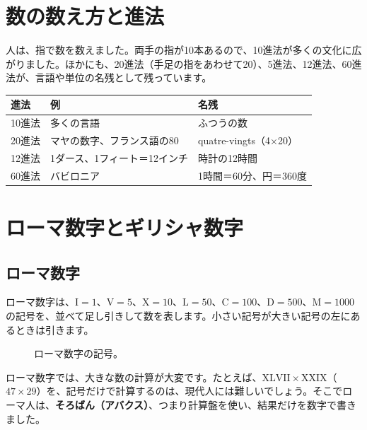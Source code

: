 \documentclass[a4paper,11pt,openany]{ltjsbook}
\begin{document}
\section{数の数え方と進法}

人は、指で数を数えました。両手の指が10本あるので、10進法が多くの文化に広がりました。ほかにも、20進法（手足の指をあわせて20）、5進法、12進法、60進法が、言語や単位の名残として残っています。

\begin{center}
\begin{tabular}{lll}
\toprule
進法 & 例 & 名残\\
\midrule
10進法 & 多くの言語 & ふつうの数\\
20進法 & マヤの数字、フランス語の80 & quatre-vingts（4×20）\\
12進法 & 1ダース、1フィート＝12インチ & 時計の12時間\\
60進法 & バビロニア & 1時間＝60分、円＝360度\\
\bottomrule
\end{tabular}
\end{center}

\section{ローマ数字とギリシャ数字}

\subsection{ローマ数字}

ローマ数字は、$\mathrm{I}=1$、$\mathrm{V}=5$、$\mathrm{X}=10$、$\mathrm{L}=50$、$\mathrm{C}=100$、$\mathrm{D}=500$、$\mathrm{M}=1000$ の記号を、並べて足し引きして数を表します。小さい記号が大きい記号の左にあるときは引きます。

\begin{figure}[htbp]
\centering
{}
\caption{ローマ数字の記号。}
\end{figure}

ローマ数字では、大きな数の計算が大変です。たとえば、$\mathrm{XLVII}\times\mathrm{XXIX}$（$47\times29$）を、記号だけで計算するのは、現代人には難しいでしょう。そこでローマ人は、\textbf{そろばん（アバクス）}、つまり計算盤を使い、結果だけを数字で書きました。
\end{document}
